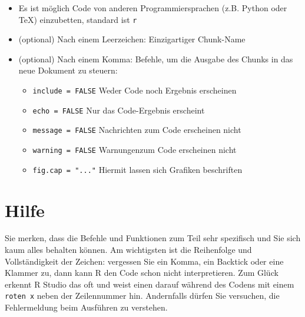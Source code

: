 \documentclass[
]{book}
\providecommand{\tightlist}{%
  \setlength{\itemsep}{0pt}\setlength{\parskip}{0pt}}
\theoremstyle{definition}
\theoremstyle{definition}
\theoremstyle{definition}
\theoremstyle{definition}
\theoremstyle{remark}
\begin{document}
\begin{itemize}
\item
  Es ist möglich Code von anderen Programmiersprachen (z.B. Python oder TeX) einzubetten, standard ist \texttt{r}
\item
  (optional) Nach einem Leerzeichen: Einzigartiger Chunk-Name
\item
  (optional) Nach einem Komma: Befehle, um die Ausgabe des Chunks in das neue Dokument zu steuern:

  \begin{itemize}
  \tightlist
  \item
    \texttt{include\ =\ FALSE} Weder Code noch Ergebnis erscheinen
  \item
    \texttt{echo\ =\ FALSE} Nur das Code-Ergebnis erscheint
  \item
    \texttt{message\ =\ FALSE} Nachrichten zum Code erscheinen nicht
  \item
    \texttt{warning\ =\ FALSE} Warnungenzum Code erscheinen nicht
  \item
    \texttt{fig.cap\ =\ "..."} Hiermit lassen sich Grafiken beschriften
  \end{itemize}
\end{itemize}

\hypertarget{hilfe}{%
\section{Hilfe}\label{hilfe}}

Sie merken, dass die Befehle und Funktionen zum Teil sehr spezifisch und Sie sich kaum alles behalten können. Am wichtigsten ist die Reihenfolge und Vollständigkeit der Zeichen: vergessen Sie ein Komma, ein Backtick oder eine Klammer zu, dann kann R den Code schon nicht interpretieren. Zum Glück erkennt R Studio das oft und weist einen darauf während des
Codens mit einem \texttt{roten\ x} neben der Zeilennummer hin. Andernfalls dürfen Sie versuchen, die Fehlermeldung beim Ausführen zu verstehen.
\end{document}
